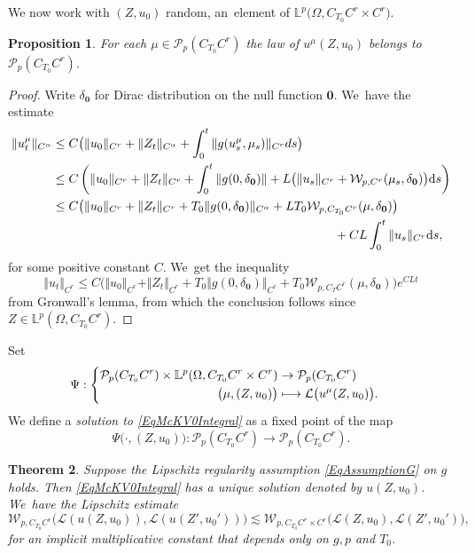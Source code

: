 \documentclass[10pt]{amsart}
\newcommand\mto{\mathchoice{\longmapsto}{\mapsto}{\mapsto}{\mapsto}}
\newtheorem{thm}{Theorem}
\newtheorem{prop}[thm]{Proposition}
\theoremstyle{definition}
\newcommand{\bfzero}{\mathbf{0}}
\newcommand{\mcL}{\mathcal{L}}
\newcommand{\mcP}{\mathcal{P}}
\newcommand\mcW{\mathcal W}
\newcommand{\bbL}{\mathbb{L}}
\newcommand{\dd}{\textup{d}}
\newcommand{\norme}[1]{\Vert #1 \Vert}
\let\dpl\displaystyle
\begin{document}
We now work with $(Z,u_0)$ random, an~element of $\bbL^p\bigl(\Omega, C_{T_0}C^r \times C^r\bigr)$.

\begin{prop}
For each $\mu\!\in\!\mathcal{P}_p(C_{T_0}C^r)$ the law of $u^\mu(Z,u_0)$ belongs to~$\mcP_p(C_{T_0}C^r)$.
\end{prop}

\begin{proof}
Write $\delta_{\bfzero}$ for Dirac distribution on the null function $\bfzero$. We~have the estimate
\begin{align*}
\norme{u_t^\mu}_{C^\alpha} &\leq C\bigl( \norme{u_0}_{C^r} + \norme{Z_t}_{C^\alpha} + \int_0^t \norme{ g(u_s^\mu,\mu_s)}_{C^r} ds \bigr) \\
&\leq C\left( \norme{u_0}_{C^r}+\norme{Z_t}_{C^r}+\int_0^t \norme{g(0,\delta_{\bfzero})}+L\bigl(\norme{u_s}_{C^r}+\mcW_{p,C^r}(\mu_s,\delta_{\bfzero}) \bigr)\dd s \right) \\
&\leq C\bigl( \norme{u_0}_{C^r}+\norme{Z_t}_{C^r} + T_0 \norme{g(0,\delta_{\bfzero})}_{C^\alpha} + L T_0 \mcW_{p,C_{T_0}C^r}(\mu,\delta_{\bfzero}) \bigr) \\
&\hspace*{8cm}+ CL \int_0^t\norme{u_s}_{C^r} \dd s,
\end{align*}
for some positive constant $C$. We~get the inequality
\[
\norme{u_t}_{C^r}\leq C\bigl( \norme{u_0}_{C^r}+\norme{Z_t}_{C^r} + T_0 \norme{g(0,\delta_{\bfzero})}_{C^r} + T_0\mcW_{p,C_TC^r}(\mu,\delta_{\bfzero}) \bigr)e^{CLt}
\]
from Gronwall's lemma, from which the conclusion follows since $Z\in \bbL^p(\Omega,C_{T_0}C^r)$.
\end{proof}

Set
\[
\Psi :
\begin{cases}
\begin{aligned} \mathcal{P}_p(C_{T_0}C^r) \times \bbL^p(\Omega, C_{T_0}C^r\times C^r) & \dpl\to \mathcal{P}_p(C_{T_0} C^r) \\ \bigl(\mu, (Z,u_0)\bigr) & \dpl\mto \mcL\bigl(u^\mu(Z,u_0)\bigr).\end{aligned}
\end{cases}
\]
We define a \emph{solution to \eqref{EqMcKV0Integral}} as a fixed point of the map
\[
\Psi\bigl(\cdot,(Z,u_0)\bigr) : \mathcal{P}_p(C_{T_0} C^r)\to \mathcal{P}_p(C_{T_0} C^r).
\]

\begin{thm} \label{ThmAffine}
Suppose the Lipschitz regularity assumption \eqref{EqAssumptionG} on $g$ holds. Then \eqref{EqMcKV0Integral} has a unique solution denoted by $u(Z,u_0)$. We~have the Lipschitz estimate
\begin{equation} \label{EqLispchitzEstimate}
\mathcal{W}_{p,C_{T_0}C^r}\bigl(\mcL(u(Z,u_0)), \mcL(u(Z', u_0' ))\bigr) \lesssim \mathcal{W}_{p,C_{T_0}C^r\times C^r}\bigl(\mcL(Z,u_0), \mcL(Z', u_0' )\bigr),
\end{equation}
for an implicit multiplicative constant that depends only on $g,p$ and $T_0$.
\end{thm}
\end{document}
